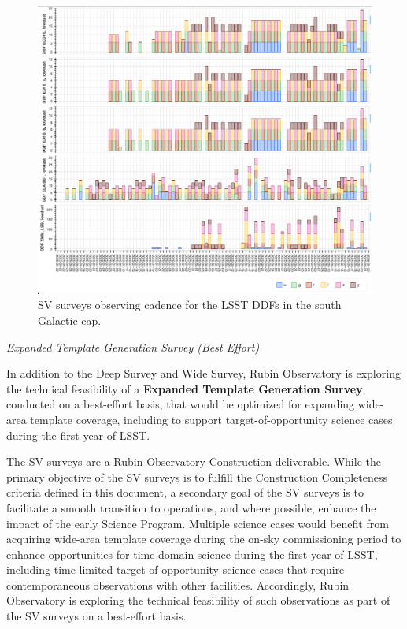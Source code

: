 \begin{figure}[htbp]
    \begin{center}
    \includegraphics[width=1\textwidth]{./sv_surveys_ddf_cadence.png}
    \caption{SV surveys observing cadence for the LSST DDFs in the south Galactic cap.}
    \label{sv_surveys_ddf_visits}
    \end{center}
\end{figure}


\textit{Expanded Template Generation Survey (Best Effort)}

In addition to the Deep Survey and Wide Survey, Rubin Observatory is exploring the technical feasibility of a \textbf{Expanded Template Generation Survey}, conducted on a best-effort basis, that would be optimized for expanding wide-area template coverage, including to support target-of-opportunity science cases during the first year of LSST.

The SV surveys are a Rubin Observatory Construction deliverable.
While the primary objective of the SV surveys is to fulfill the Construction Completeness criteria defined in this document, a secondary goal of the SV surveys is to facilitate a smooth transition to operations, and where possible, enhance the impact of the early Science Program.
Multiple science cases would benefit from acquiring wide-area template coverage during the on-sky commissioning period to enhance opportunities for time-domain science during the first year of LSST, including time-limited target-of-opportunity science cases that require contemporaneous observations with other facilities.
Accordingly, Rubin Observatory is exploring the technical feasibility of such observations as part of the SV surveys on a best-effort basis.

